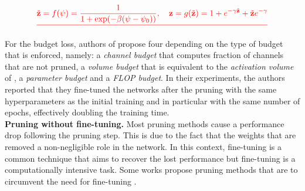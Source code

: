 \DIFdelbegin \begin{displaymath}
  \DIFdel{\label{eqn:chap1:chipnet_f_g}
  \tilde{\mathbf{z}} = f(\psi) = \frac{1}{1 + \exp(-\beta(\psi-\psi_0))}, \quad \mathbf{z} = g(\tilde{\mathbf{z}}) = 1 + e^{-\gamma\tilde{\mathbf{z}}} + \tilde{\mathbf{z}}e^{-\gamma}
}\end{displaymath}%
\DIFdelend %

\DIFdelbegin %
\DIFdelend %
\DIFaddbegin 

\emph{} \DIFaddend For the
budget loss, authors of \cite{tiwari2021chipnet} propose four \DIFdelbegin {}\DIFdelend \DIFaddbegin {}\DIFaddend depending
on the type of budget that is enforced, namely: a \emph{channel budget} that
computes \DIFaddbegin {}\DIFaddend fraction of channels that are not pruned, a \emph{volume budget}
that is equivalent to the \emph{activation volume} of
\cite{lemaire2019structured}, a \emph{parameter budget} and \DIFdelbegin {}\DIFdelend \DIFaddbegin {}\DIFaddend a
\emph{\ac{FLOP} budget}. In their experiments, the authors reported that they
fine-tuned the networks after the pruning with the same hyperparameters as the
initial training \DIFdelbegin {}\DIFdelend \DIFaddbegin {}\DIFaddend and in particular with the same number of epochs,
effectively doubling the training time.\\

\noindent\textbf{Pruning without fine-tuning.} Most pruning methods cause a
performance drop following the pruning step. This is due to the fact that the
weights that are removed \DIFdelbegin {}\DIFdelend \DIFaddbegin {}\DIFaddend a non-negligible role in the network. In this
context, fine-tuning is a common technique that aims to recover the lost
performance but fine-tuning is a computationally intensive task. Some works
propose pruning methods that are \DIFdelbegin {}\DIFdelend \DIFaddbegin {}\DIFaddend to circumvent the need for fine-tuning
\cite{DBLP:conf/nips/HassibiS92,DBLP:conf/icnn/HassibiSW93,DBLP:conf/icml/KangH20}.\\


